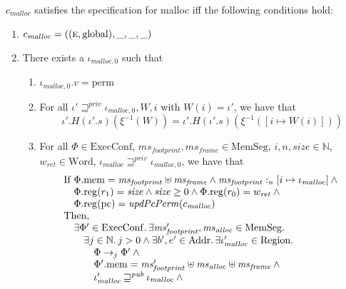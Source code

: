\documentclass[format=acmsmall, review=true, screen=true]{acmart}
\newcommand{\var}[1]{\mathit{#1}}
\newcommand{\hs}{\var{ms}}
\newcommand{\ms}{\hs}
\newcommand{\pcreg}{\mathrm{pc}}
\newcommand{\heap}{\var{mem}}
\newcommand{\hsframe}{\hs_\var{frame}}
\newcommand{\size}{\var{size}}
\newcommand{\plainproj}[1]{\mathrm{#1}}
\newcommand{\memheap}[1][\Phi]{#1.\plainproj{mem}}
\newcommand{\memreg}[1][\Phi]{#1.\plainproj{reg}}
\newcommand{\plainfun}[2]{
  \ifthenelse{\equal{#2}{}}
  {\mathit{#1}}
  {\mathit{#1}(#2)}
}
\newcommand{\updatePcPerm}[1]{\plainfun{updPcPerm}{#1}}
\newcommand{\futurewk}{\mathbin{\sqsupseteq}^{\var{pub}}}
\newcommand{\futurestr}{\mathbin{\sqsupseteq}^{\var{priv}}}
\newcommand{\heapSat}[3][\heap]{#1 :_{#2} #3}
\newcommand{\codelabel}[1]{\mathit{#1}}
\newcommand{\malloc}{\codelabel{malloc}}
\newcommand{\plaindom}[1]{\mathrm{#1}}
\newcommand{\Words}{\plaindom{Word}}
\newcommand{\Addrs}{\plaindom{Addr}}
\newcommand{\ExecConfs}{\plaindom{ExecConf}}
\newcommand{\HeapSegments}{\plaindom{MemSeg}}
\newcommand{\nats}{\mathbb{N}}
\newcommand{\Regions}{\plaindom{Region}}
\newcommand{\plainperm}[1]{\textsc{#1}}
\newcommand{\entry}{\plainperm{e}}
\newcommand{\plainlocality}[1]{\mathrm{#1}}
\newcommand{\glob}{\plainlocality{global}}
\newcommand{\plainview}[1]{\mathrm{#1}}
\newcommand{\perma}{\plainview{perm}}
\newcommand{\step}[1][]{\rightarrow_{#1}}
\newenvironment{toplas}%
    {\color{OliveGreen}}{}
\begin{document}
\begin{toplas}
\begin{definition}
  \label{spec:malloc}
  $c_\malloc$ satisfies the specification for malloc iff the following
  conditions hold:
  \begin{enumerate}
  \item \label{item:malloc-spec:eg} $c_\malloc = ((\entry,\glob),\_,\_,\_)$
  \item \label{item:malloc-spec:reg} There exists a $\iota_{\malloc,0}$ such that
    \begin{enumerate}
    \item \label{item:malloc-spec:perm} $\iota_{\malloc,0}.v = \perma$
    \item \label{item:malloc-spec:independent} For all $\iota' \futurestr \iota_{\malloc,0}, W,i$ with
      $W(i)=\iota'$, we have that
      \begin{equation*}
        \iota'.H (\iota'.s) (\xi^{-1}(W)) = \iota'.H (\iota'.s) (\xi^{-1}([i \mapsto W(i)]))
      \end{equation*}
    \item \label{item:malloc-spec:correct-exec} For all $\Phi \in \ExecConfs$, $\ms_{\var{footprint}}, \hsframe \in
      \HeapSegments$, $i, n, \size \in \nats$, $w_{\var{ret}} \in \Words$,
      $\iota_\malloc \futurestr \iota_{\malloc,0}$, we have that
      \[
        \begin{array}{l}
          \text{If }
          \memheap = \ms_{\var{footprint}} \uplus \hsframe \land \heapSat[\ms_{\var{footprint}}]{n}{[i \mapsto \iota_\malloc]} \land{} \\
          \quad\memreg(r_1) = \size \land \size \geq 0 \land  \memreg(r_0) = w_{\var{ret}} \land{} \\
          \quad \memreg(\pcreg) = \updatePcPerm{c_\malloc} \\ %
          \text{Then, } \\
          \quad \exists \Phi' \in \ExecConfs \ldotp \exists \ms_{\var{footprint}}', \ms_{\var{alloc}} \in \HeapSegments\ldotp\\
          \qquad \exists j \in \nats \ldotp j > 0 \land \exists b',e'\in \Addrs \ldotp \exists \iota_\malloc' \in \Regions \ldotp \\
          \qquad \quad \Phi \step[j] \Phi' \land{} \\
          \qquad \quad \memheap[\Phi']=\ms_{\var{footprint}}' \uplus \hs_{\var{alloc}} \uplus \hsframe \land{}\\
          \qquad \quad \iota_{\malloc}' \futurewk \iota_\malloc \land{} \\

\end{array}\]
\end{enumerate}
\end{enumerate}
\end{definition}
\end{toplas}
\end{document}
